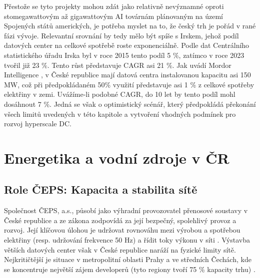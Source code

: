 Přestože se tyto projekty mohou zdát jako relativně nevýznamné oproti stomegawattovým až gigawattovým AI továrnám plánovaným na území Spojených států amerických, je potřeba myslet na to, že český trh je pořád v rané fázi vývoje. Relevantní srovnání by tedy mělo být spíše s Irskem, jehož podíl datových center na celkové spotřebě roste exponenciálně. Podle dat Centrálního statistického úřadu Irska \cite{central_statistics_office_ireland_share_2024} byl v roce 2015 tento podíl 5 \%, zatímco v roce 2023 tvořil již 23 \%. Tento růst představuje CAGR asi 21 \%. Jak uvádí Mordor Intelligence \cite{mordor_intelligence_czechia_2025}, v České republice mají datová centra instalovanou kapacitu asi 150 MW, což při předpokládaném 50\% využití představuje asi 1 \% z celkové spotřeby elektřiny v zemi. Uvážíme-li podobné CAGR, do 10 let by tento podíl mohl dosáhnout 7 \%. Jedná se však o optimistický scénář, který předpokládá překonání všech limitů uvedených v této kapitole a vytvoření vhodných podmínek pro rozvoj hyperscale DC.

\section{Energetika a vodní zdroje v ČR}
\label{sec:cz_energie}


\subsection{Role ČEPS: Kapacita a stabilita sítě}
\label{subsec:cz_energie_ceps}

Společnost ČEPS, a.s., působí jako výhradní provozovatel přenosové soustavy v České republice a ze zákona zodpovídá za její bezpečný, spolehlivý provoz a rozvoj. Její klíčovou úlohou je udržovat rovnováhu mezi výrobou a spotřebou elektřiny (resp. udržování frekvence 50 Hz) a řídit toky výkonu v síti \cite{bartos_energetika_2025}. Výstavba větších datových center však v České republice naráží na fyzické limity sítě. Nejkritičtější je situace v metropolitní oblasti Prahy a ve středních Čechách, kde se koncentruje největší zájem developerů (tyto regiony tvoří 75 \% kapacity trhu) \cite{mordor_intelligence_czechia_2025}.

